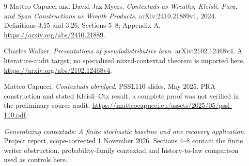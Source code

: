 \documentclass[11pt,a4paper]{article}
\begin{document}
\begin{thebibliography}{9}
Matteo Capucci and David Jaz Myers.
\emph{Contextads as Wreaths; Kleisli, Para, and Span Constructions as Wreath
Products}. arXiv:2410.21889v1, 2024.
Definitions 3.15 and 3.26; Sections 5--8; Appendix A.
\url{https://arxiv.org/abs/2410.21889}.

Charles Walker.
\emph{Presentations of pseudodistributive laws}.
arXiv:2102.12468v4.
A literature-audit target; no specialized mixed-contextad theorem is imported
here.
\url{https://arxiv.org/abs/2102.12468v4}.

Matteo Capucci.
\emph{Contextads abridged}. PSSL110 slides, May 2025.
PRA construction and stated Kleisli--Ctx result; a complete proof was not
verified in the preliminary source audit.
\url{https://matteocapucci.eu/assets/2025/05/pssl-110.pdf}.

\emph{Generalizing contextads: A finite stochastic baseline and one recovery
application}. Project report, scope-corrected 1 November 2026.
Sections 4--8 contain the finite writer obstruction, probability-family
contextad and history-to-law comparison used as controls here.
\end{thebibliography}
\end{document}
